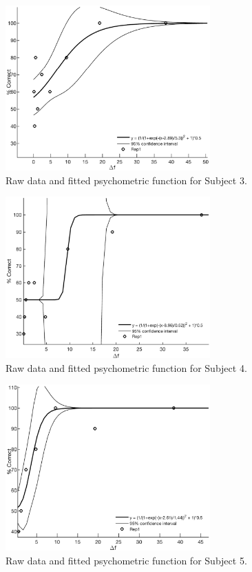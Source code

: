 \begin{figure}[htb]
\centering
\includegraphics[width = 0.7\textwidth]{Figure/Vores_Figurer/Subject3.png} 
\caption{Raw data and fitted psychometric function for Subject 3.}
\label{fig:Subject3}
\end{figure}
%
\begin{figure}[htb]
\centering
\includegraphics[width = 0.7\textwidth]{Figure/Vores_Figurer/Subject4.png} 
\caption{Raw data and fitted psychometric function for Subject 4.}
\label{fig:Subject4}
\end{figure}
%
\begin{figure}[htb]
\centering
\includegraphics[width = 0.7\textwidth]{Figure/Vores_Figurer/Subject5.png} 
\caption{Raw data and fitted psychometric function for Subject 5.}
\label{fig:Subject5}
\end{figure}

